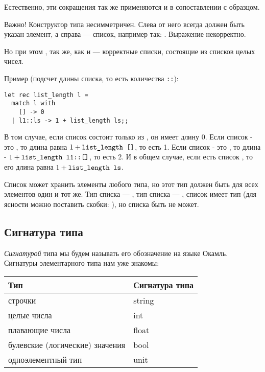 Естественно, эти сокращения так же применяются и в сопоставлении с образцом.

Важно! Конструктор типа \s{::} несимметричен. Слева от него всегда должен
быть указан элемент, а справа --- список, например так: . 
Выражение  некорректно.

Но при этом \s{[1]::[[1]]}, так же, как и \s{[1]::[]} --- корректные списки,
состоящие из списков целых чисел.

Пример (подсчет длины списка, то есть количества \verb!::!):

\begin{verbatim}
let rec list_length l =
  match l with
    [] -> 0
  | l1::ls -> 1 + list_length ls;;
\end{verbatim}

В том случае, если список состоит только из \s{[]}, он имеет длину 0.
Если список - это , то длина равна $1 + \texttt{list\_length\ []}$, то есть 1.
Если список - это , то длина - $1 + \texttt{list\_length\ l1::[]}$, то есть 2.
И в общем случае, если есть список , то его длина равна
$1 + \texttt{list\_length\ ls}$.

Список может хранить элементы любого типа, но этот тип должен быть
для всех элементов один и тот же.
Тип списка \s{[1;2;3]} --- , тип списка \s{["1";"a";"c"]} --- 
,
список \s{[[1];[2];[]]} имеет тип  (для ясности можно поставить
скобки: ), но списка \s{[1;"2"]} быть не может.




\subsection{Сигнатура типа}

\emph{Сигнатурой} типа мы будем называть его обозначение на языке Окамль.
Сигнатуры элементарного типа нам уже знакомы:

\begin{tabular}{ll}
\hline
Тип&Сигнатура типа\\
\hline
строчки            &string\\
целые числа        &int\\
плавающие числа    &float\\
булевские (логические) значения &bool\\
одноэлементный тип &unit\\
\hline
\end{tabular}

